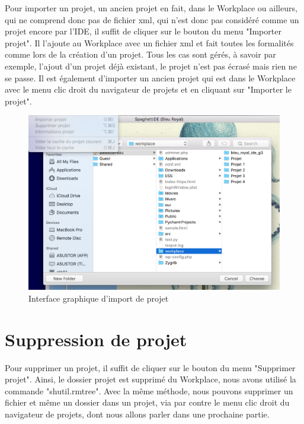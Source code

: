 \documentclass[a4paper,12pt]{article}
\begin{document}
Pour importer un projet, un ancien projet en fait, dans le Workplace ou ailleurs, qui ne comprend donc pas de fichier xml, qui n'est donc pas considéré comme un projet encore par l'IDE, il suffit de cliquer sur le bouton du menu "Importer projet". Il l'ajoute au Workplace avec un fichier xml et fait toutes les formalités comme lors de la création d'un projet. Tous les cas sont gérés, à savoir par exemple, l'ajout d'un projet déjà existant, le projet n'est pas écrasé mais rien ne se passe. Il est également d'importer un ancien projet qui est dans le Workplace avec le menu clic droit du navigateur de projets et en cliquant sur "Importer le projet".

\begin{figure}[h!]
			\begin{center}
				\includegraphics[scale=0.5]{images/import.png}
				\caption{Interface graphique d'import de projet}
			\end{center}
		\end{figure}
		
\section{Suppression de projet}

Pour supprimer un projet, il suffit de cliquer sur le bouton du menu "Supprimer projet". Ainsi, le dossier projet est supprimé du Workplace, nous avons utilisé la commande "shutil.rmtree". Avec la même méthode, nous pouvons supprimer un fichier et même un dossier dans un projet, via par contre le menu clic droit du navigateur de projets, dont nous allons parler dans une prochaine partie.
\end{document}
